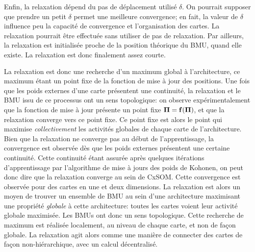 \documentclass[../main]{subfiles}
\begin{document}
Enfin, la relaxation dépend du pas de déplacement utilisé $\delta$. On pourrait supposer que prendre un petit $\delta$ permet une meilleure convergence; en fait, la valeur de $\delta$ influence peu la capacité de convergence et l'organisation des cartes. La relaxation pourrait être effectuée sans utiliser de pas de relaxation. Par ailleurs, la relaxation est initialisée proche de la position théorique du BMU, quand elle existe. La relaxation est donc finalement assez courte.



La relaxation est donc une recherche d'un maximum global à l'architecture, ce maximum étant un point fixe de la fonction de mise à jour des positions.
Une fois que les poids externes d'une carte présentent une continuité, la relaxation et le BMU issu de ce processus ont un sens topologique: on observe expérimentalement que la fonction de mise à jour présente un point fixe $\mathbf{\Pi} = \mathbf{f}(\mathbf{\Pi})$, et que la relaxation converge vers ce point fixe. Ce point fixe est alors le point qui maximise \emph{collectivement} les activités globales de chaque carte de l'architecture.
Bien que la relaxation ne converge pas au début de l'apprentissage, la convergence est observée dès que les poids externes présentent une certaine continuité. Cette continuité étant assurée après quelques itérations d'apprentissage par l'algorithme de mise à jours des poids de Kohonen, on peut donc dire que la relaxation converge au sein de CxSOM. Cette convergence est observée pour des cartes en une et deux dimensions.
La relaxation est alors un moyen de trouver un ensemble de BMU au sein d'une architecture maximisant une propriété \emph{globale} à cette architecture: toutes les cartes voient leur activité globale maximisée. Les BMUs ont donc un sens topologique. Cette recherche de maximum est réalisée localement, au niveau de chaque carte, et non de façon globale. La relaxation agit alors comme une manière de connecter des cartes de façon non-hiérarchique, avec un calcul décentralisé.

\end{document}
